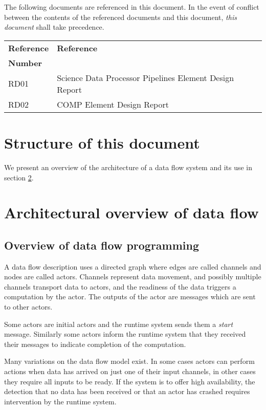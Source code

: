 \documentclass[11pt,a4paper]{article}
\begin{document}
The following documents are referenced in this document. In the event of
conflict between the contents of the referenced documents and this document,
\emph{this document} shall take precedence.

\begin{center}{
\begin{tabularx}{\textwidth}{|X|X|}
    \hline
    \bf{Reference} & \bf{Reference}\\
    \bf{Number} & \\
    \hline
    RD01 & Science Data Processor Pipelines Element Design Report\\\hline
    RD02 & COMP Element Design Report\\\hline
  \end{tabularx}}
\end{center}

\fi

\newpage
\section{Structure of this document}

We present an overview of the architecture of a data flow system and its use in section \ref{sec:dataflow-definitions}.  




\section{Architectural overview of data flow}
\label{sec:dataflow-definitions}

\subsection{Overview of data flow programming}

A data flow description uses a directed graph where edges are called channels and nodes are called actors.  Channels represent data movement, and possibly multiple channels transport data to actors, and the readiness of the data triggers a computation by the actor.  The outputs of the actor are messages which are sent to other actors. 

Some actors are initial actors and the runtime system sends them a {\em start} message.  Similarly some actors inform the runtime system that they received their messages to indicate completion of the computation.  

Many variations on the data flow model exist.  In some cases actors can perform actions when data has arrived on just one of their input channels, in other cases they require all inputs to be ready.  If the system is to offer high availability, the detection that no data has been received or that an actor has crashed requires intervention by the runtime system.
\end{document}
